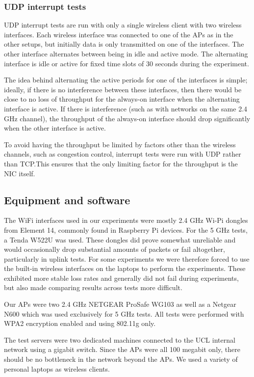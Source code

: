 \subsubsection{UDP interrupt tests}
\label{sec:met:setups:intudp}
UDP interrupt tests are run with only a single wireless client with two wireless
interfaces. Each wireless interface was connected to one of the APs as in the
other setups, but initially data is only transmitted on one of the interfaces.
The other interface alternates between being in idle and active mode. The
alternating interface is idle or active for fixed time slots of 30 seconds
during the experiment.

The idea behind alternating the active periods for one of the interfaces is
simple; ideally, if there is no interference between these interfaces, then
there would be close to no loss of throughput for the always-on interface when
the alternating interface is active. If there is interference (such as with
networks on the same 2.4 GHz channel), the throughput of the always-on interface
should drop significantly when the other interface is active.

To avoid having the throughput be limited by factors other than the wireless
channels, such as congestion control, interrupt tests were run with UDP rather than TCP.\@ This ensures that
the only limiting factor for the throughput is the NIC itself.

\subsection{Equipment and software}
\label{sec:met:equip}
The WiFi interfaces used in our experiments were mostly 2.4 GHz Wi-Pi dongles
from Element 14, commonly found in Raspberry Pi devices. For the 5 GHz tests, a
Tenda W522U
was used. These dongles did prove somewhat unreliable and would occasionally drop
substantial amounts of packets or fail altogether, particularly in uplink tests.
For some experiments we were therefore forced to use the built-in wireless
interfaces on the laptops to perform the experiments. These exhibited
more stable loss rates and generally did not fail during experiments, but also
made comparing results across tests more difficult.

Our APs were two 2.4 GHz NETGEAR ProSafe WG103 as well as a Netgear N600
which was used exclusively for 5 GHz tests. All tests were performed with WPA2
encryption enabled and using 802.11g only.

The test servers were two dedicated machines connected to the UCL internal
network using a gigabit switch. Since the APs were all 100 megabit
only, there should be no bottleneck in the network beyond the APs. We used a variety of personal laptops as wireless clients.

